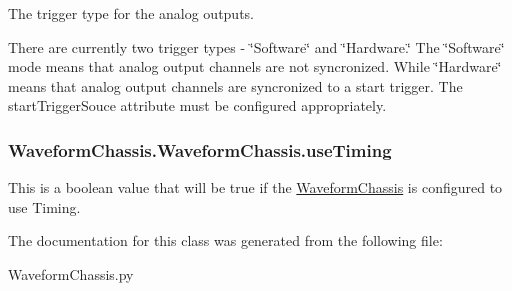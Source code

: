 The trigger type for the analog outputs. 

There are currently two trigger types -\/ \char`\"{}\-Software\char`\"{} and \char`\"{}\-Hardware.\char`\"{} The \char`\"{}\-Software\char`\"{} mode means that analog output channels are not syncronized. While \char`\"{}\-Hardware\char`\"{} means that analog output channels are syncronized to a start trigger. The start\-Trigger\-Souce attribute must be configured appropriately. \hypertarget{class_waveform_chassis_1_1_waveform_chassis_a18dae1f29299d1dbd02b06e0f2b5270c}{
\subsubsection[{use\-Timing}]{\setlength{\rightskip}{0pt plus 5cm}Waveform\-Chassis.\-Waveform\-Chassis.\-use\-Timing}}\label{class_waveform_chassis_1_1_waveform_chassis_a18dae1f29299d1dbd02b06e0f2b5270c}


This is a boolean value that will be true if the \hyperlink{class_waveform_chassis_1_1_waveform_chassis}{Waveform\-Chassis} is configured to use Timing. 



The documentation for this class was generated from the following file\-:\begin{DoxyCompactItemize}
\item 
Waveform\-Chassis.\-py\end{DoxyCompactItemize}
